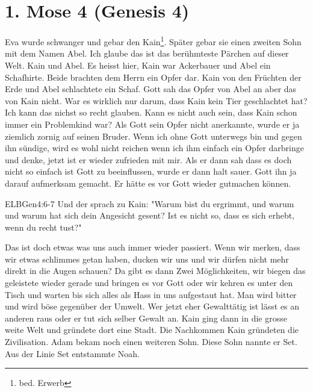 \section{1. Mose 4 (Genesis 4)}
Eva wurde schwanger und gebar den Kain\footnote{bed. Erwerb}. Später gebar sie einen zweiten Sohn mit dem Namen Abel. Ich glaube das ist das berühmteste Pärchen auf dieser Welt. Kain und Abel. Es heisst hier, Kain war Ackerbauer und Abel ein Schafhirte. Beide brachten dem Herrn ein Opfer dar. Kain von den Früchten der Erde und Abel schlachtete ein Schaf. Gott sah das Opfer von Abel an aber das von Kain nicht. War es wirklich nur darum, dass Kain kein Tier geschlachtet hat? Ich kann das nichst so recht glauben. Kann es nicht auch sein, dass Kain schon immer ein Problemkind war? Als Gott sein Opfer nicht anerkannte, wurde er ja ziemlich zornig auf seinen Bruder. Wenn ich ohne Gott unterwegs bin und gegen ihn sündige, wird es wohl nicht reichen wenn ich ihm einfach ein Opfer darbringe und denke, jetzt ist er wieder zufrieden mit mir. Als er dann sah dass es doch nicht so einfach ist Gott zu beeinflussen, wurde er dann halt sauer. Gott ihn ja darauf aufmerksam gemacht. Er hätte es vor Gott wieder gutmachen können.
\begin{bibeltext}{ELB}{Gen}{4:6-7}
	Und der \herr{} sprach zu Kain: "Warum bist du ergrimmt, und warum und warum hat sich dein Angesicht gesent? Ist es nicht so, dass es sich erhebt, wenn du recht tust?"
\end{bibeltext}
Das ist doch etwas was uns auch immer wieder passiert. Wenn wir merken, dass wir etwas schlimmes getan haben, ducken wir uns und wir dürfen nicht mehr direkt in die Augen schauen? Da gibt es dann Zwei Möglichkeiten, wir biegen das geleistete wieder gerade und bringen es vor Gott oder wir kehren es unter den Tisch und warten bis sich alles als Hass in uns aufgestaut hat. Man wird bitter und wird böse gegenüber der Umwelt. Wer jetzt eher Gewalttätig ist lässt es an anderen raus oder er tut sich selber Gewalt an. Kain ging dann in die grosse weite Welt und gründete dort eine Stadt. Die Nachkommen Kain gründeten die Zivilisation. Adam bekam noch einen weiteren Sohn. Diese Sohn nannte er Set. Aus der Linie Set entstammte Noah.
\newpage
